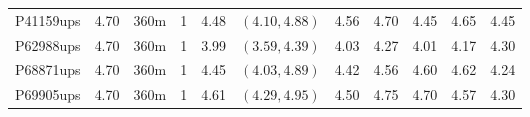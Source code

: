 \begin{landscape}
\begin{longtable}{cccc|cc|ccccc}
  P41159ups & 4.70 & 360m &   1 & 4.48 & $(4.10, 4.88)$ & 4.56 & 4.70 & 4.45 & 4.65 & 4.45 \\ 
  P62988ups & 4.70 & 360m &   1 & 3.99 & $(3.59, 4.39)$ & 4.03 & 4.27 & 4.01 & 4.17 & 4.30 \\ 
  P68871ups & 4.70 & 360m &   1 & 4.45 & $(4.03, 4.89)$ & 4.42 & 4.56 & 4.60 & 4.62 & 4.24 \\ 
  P69905ups & 4.70 & 360m &   1 & 4.61 & $(4.29, 4.95)$ & 4.50 & 4.75 & 4.70 & 4.57 & 4.30 \\ 
   \hline
\end{longtable}
\end{landscape}

